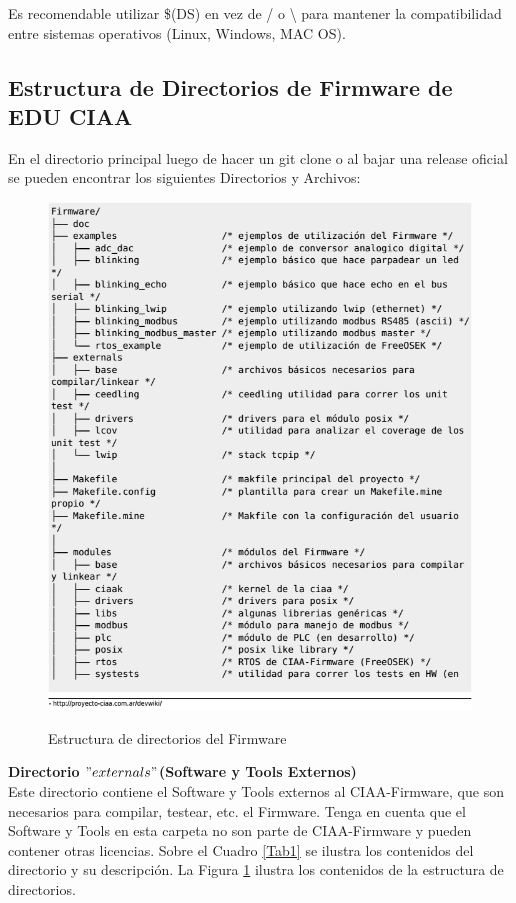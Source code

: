 \documentclass[12pt,letterpaper]{article}
\begin{document}
Es recomendable utilizar \$(DS) en vez de / o \textbackslash{} para mantener la compatibilidad entre sistemas operativos (Linux, Windows, MAC OS).
{
\subsection{Estructura de Directorios de Firmware de EDU CIAA}
En el directorio principal luego de hacer un git clone o al bajar una release oficial se pueden encontrar los siguientes Directorios y Archivos\cite{estructuradedirectorios}:


\begin{figure}[!h]
\centering
\includegraphics[width=8 cm]{figuras/est_directorios_ciaa.png}\\
\caption{Estructura de directorios del Firmware}
\label{Fig3}
\end{figure}

\textbf{Directorio $"externals"$(Software y Tools Externos)}\\
Este directorio contiene el Software y Tools externos al CIAA-Firmware, que son necesarios para compilar, testear, etc. el Firmware. Tenga en cuenta que el Software y Tools en esta carpeta no son parte de CIAA-Firmware y pueden contener otras licencias. Sobre el Cuadro \ref{Tab1} se ilustra los contenidos del directorio y su descripción. La Figura \ref{Fig3} ilustra los contenidos de la estructura de directorios.
 \\

}
\end{document}
